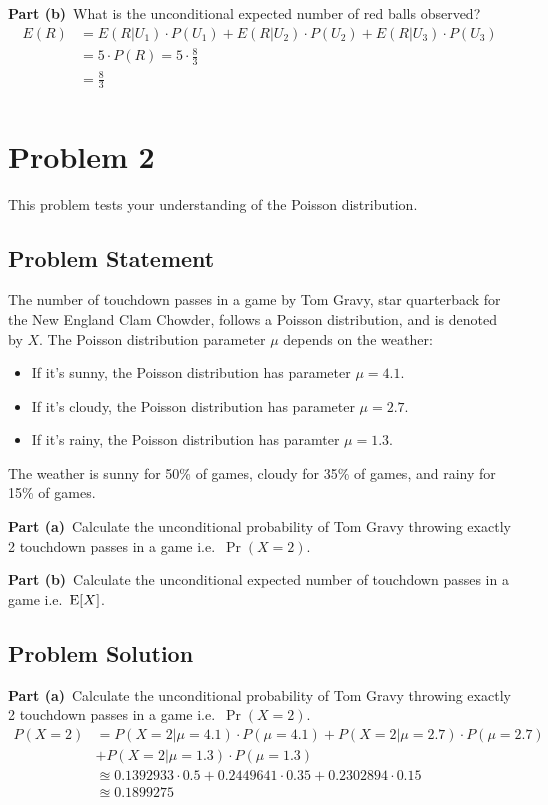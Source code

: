 \documentclass[12pt]{article}
\theoremstyle{definition}
\begin{document}
\newpage
\noindent
{\bf Part (b)}\ What is the unconditional expected number of red balls observed?
\begin{align*}
E(R) &= E(R|U_1) \cdot P(U_1) +  E(R|U_2) \cdot P(U_2) +  E(R|U_3) \cdot P(U_3)\\
&= 5\cdot P(R) = 5\cdot\frac{8}{3}\\
&= \frac{8}{3}\\
\end{align*}


\newpage
\section*{Problem 2}

This problem tests your understanding of the Poisson distribution.

\subsection*{Problem Statement}

The number of touchdown passes in a game by Tom Gravy, star quarterback for the New England Clam Chowder, follows a Poisson distribution, and is denoted by $X$. The Poisson distribution parameter $\mu$ depends on the weather:
\begin{itemize}
	\item If it's sunny, the Poisson distribution has parameter $\mu = 4.1$.
	\item If it's cloudy, the Poisson distribution has parameter $\mu = 2.7$.
	\item If it's rainy, the Poisson distribution has paramter $\mu = 1.3$.
\end{itemize}
The weather is sunny for 50\% of games, cloudy for 35\% of games, and rainy for 15\% of games.

\bigskip
\noindent
{\bf Part (a)}\ Calculate the unconditional probability of Tom Gravy throwing exactly 2 touchdown passes in a game i.e.\ $\Pr(X = 2)$.

\bigskip
\noindent
{\bf Part (b)}\ Calculate the unconditional expected number of touchdown passes in a game i.e.\  $\hbox{E}[ X ]$.



\subsection*{Problem Solution}

\noindent
{\bf Part (a)}\ Calculate the unconditional probability of Tom Gravy throwing exactly 2 touchdown passes in a game i.e.\ $\Pr(X = 2)$.
\begin{align*}
P(X=2) &= P(X=2|\mu=4.1)\cdot P(\mu=4.1) + P(X=2|\mu=2.7)\cdot P(\mu=2.7) \\
       &+ P(X=2|\mu=1.3)\cdot P(\mu=1.3)\\
&\approxeq 0.1392933 \cdot 0.5 +  0.2449641 \cdot 0.35 +  0.2302894\cdot 0.15\\
&\approxeq 0.1899275\\
\end{align*}
\end{document}

